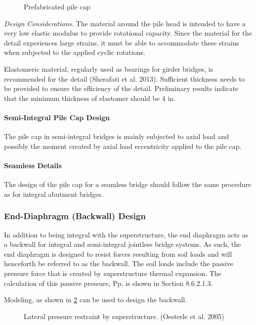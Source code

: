 \begin{figure}
  \caption{Prefabricated pile cap}
  \label{fig:prefabricated-pile-cap}
\end{figure}

\emph{Design Considerations}. The material around the pile head is intended to have a very low elastic modulus to provide rotational capacity. Since the material for the detail experiences large strains, it must be able to accommodate these strains when subjected to the applied cyclic rotations.

Elastomeric material, regularly used as bearings for girder bridges, is recommended for the detail (Sherafati et al. 2013). Sufficient thickness needs to be provided to ensure the efficiency of the detail. Preliminary results indicate that the minimum thickness of elastomer should be 4 in.

\paragraph{Semi-Integral Pile Cap Design}
The pile cap in semi-integral bridges is mainly subjected to axial load and possibly the moment created by axial load eccentricity applied to the pile cap.
\paragraph{Seamless Details}
The design of the pile cap for a seamless bridge should follow the same procedure as for integral abutment bridges.

\subsubsection{End-Diaphragm (Backwall) Design}

In addition to being integral with the superstructure, the end diaphragm acts as a backwall for integral and semi-integral jointless bridge systems. As such, the end diaphragm is designed to resist forces resulting from soil loads and will henceforth be referred to as the backwall. The soil loads include the passive pressure force that is created by superstructure thermal expansion. The calculation of this passive pressure, Pp, is shown in Section 8.6.2.1.3.

Modeling, as shown in \cref{fig:lateral-pressure-superstructure} can be used to design the backwall.

\begin{figure}
  \caption{Lateral pressure restraint by superstructure. (Oesterle et al. 2005)}
  \label{fig:lateral-pressure-superstructure}
\end{figure}

